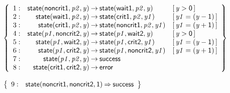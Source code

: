 \documentclass[a4paper]{article}
\def\lthtmlcheckvsize{\ifdim\ht\sizebox<\vsize 
  \ifdim\wd\sizebox<\hsize\expandafter\hfill\fi \expandafter\vfill
  \else\expandafter\vss\fi}%
\begin{document}
{\newpage\clearpage
{}%
$\displaystyle \left\{
\begin{array}{rr@{\>}c@{\>}ll}
\mathrm{1} : 
 & \mathsf{state}(\mathsf{noncrit1},\mathit{p2},\mathit{y})
 & \to 
 & \mathsf{state}(\mathsf{wait1},\mathit{p2},\mathit{y})
 & [\, \mathit{y} > \mathsf{0} \,]\\
\par
\mathrm{2} : 
 & \mathsf{state}(\mathsf{wait1},\mathit{p2},\mathit{y})
 & \to 
 & \mathsf{state}(\mathsf{crit1},\mathit{p2},\mathit{y1})
 & [\, \mathit{y1} = (\mathit{y} - \mathsf{1}) \,]\\
\par
\mathrm{3} : 
 & \mathsf{state}(\mathsf{crit1},\mathit{p2},\mathit{y})
 & \to 
 & \mathsf{state}(\mathsf{noncrit1},\mathit{p2},\mathit{y1})
 & [\, \mathit{y1} = (\mathit{y} + \mathsf{1}) \,]\\
\par
\mathrm{4} : 
 & \mathsf{state}(\mathit{p1},\mathsf{noncrit2},\mathit{y})
 & \to 
 & \mathsf{state}(\mathit{p1},\mathsf{wait2},\mathit{y})
 & [\, \mathit{y} > \mathsf{0} \,]\\
\par
\mathrm{5} : 
 & \mathsf{state}(\mathit{p1},\mathsf{wait2},\mathit{y})
 & \to 
 & \mathsf{state}(\mathit{p1},\mathsf{crit2},\mathit{y1})
 & [\, \mathit{y1} = (\mathit{y} - \mathsf{1}) \,]\\
\par
\mathrm{6} : 
 & \mathsf{state}(\mathit{p1},\mathsf{crit2},\mathit{y})
 & \to 
 & \mathsf{state}(\mathit{p1},\mathsf{noncrit2},\mathit{y1})
 & [\, \mathit{y1} = (\mathit{y} + \mathsf{1}) \,]\\
\par
\mathrm{7} : 
 & \mathsf{state}(\mathit{p1},\mathit{p2},\mathit{y})
 & \to 
 & \mathsf{success}\\
\par
\mathrm{8} : 
 & \mathsf{state}(\mathsf{crit1},\mathsf{crit2},\mathit{y})
 & \to 
 & \mathsf{error}\\
\par
\end{array}
\right\}
$%
\lthtmlindisplaymathZ
\lthtmlcheckvsize\clearpage}

{\newpage\clearpage
{}%
$\displaystyle \left\{
\begin{array}{rr@{\>}c@{\>}ll}
\mathrm{9} : 
 & \mathsf{state}(\mathsf{noncrit1},\mathsf{noncrit2},\mathsf{1})
 & \Rightarrow 
 & \mathsf{success}\\
\par
\end{array}
\right\}
$%
\lthtmlindisplaymathZ
\lthtmlcheckvsize\clearpage}
\end{document}
